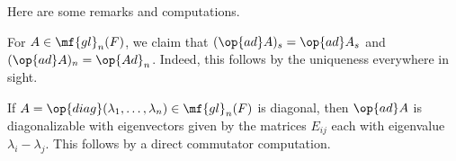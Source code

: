 \documentclass[../notes.tex]{subfiles}
\begin{document}
Here are some remarks and computations.
\begin{remark}
	For $A\in\mf{gl}_n(F)$, we claim that $(\op{ad}A)_s=\op{ad}A_s$ and $(\op{ad}A)_n=\op{Ad}_n$. Indeed, this follows by the uniqueness everywhere in sight.
\end{remark}
\begin{remark}
	If $A=\op{diag}(\lambda_1,\ldots,\lambda_n)\in\mf{gl}_n(F)$ is diagonal, then $\op{ad}A$ is diagonalizable with eigenvectors given by the matrices $E_{ij}$ each with eigenvalue $\lambda_i-\lambda_j$. This follows by a direct commutator computation.
\end{remark}
\end{document}

